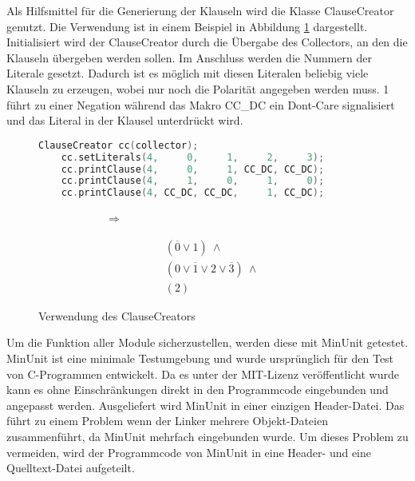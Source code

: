 Als Hilfsmittel für die Generierung der Klauseln wird die Klasse ClauseCreator genutzt. Die Verwendung ist in einem Beispiel in Abbildung \ref{fig:clausecreator} dargestellt.
Initialisiert wird der ClauseCreator durch die Übergabe des Collectors, an den die Klauseln übergeben werden sollen. Im Anschluss werden die Nummern der Literale gesetzt.
Dadurch ist es möglich mit diesen Literalen beliebig viele Klauseln zu erzeugen, wobei nur noch die Polarität angegeben werden muss. 1 führt zu einer Negation während
das Makro CC\_DC ein Dont-Care signalisiert und das Literal in der Klausel unterdrückt wird.
\begin{figure}[!h]
  \centering
  \begin{minipage}[c]{7.5cm}
    \begin{lstlisting}[language=c]
	ClauseCreator cc(collector);
	cc.setLiterals(4,     0,     1,     2,     3);
	cc.printClause(4,     0,     1, CC_DC, CC_DC);
	cc.printClause(4,     1,     0,     1,     0);
	cc.printClause(4, CC_DC, CC_DC,     1, CC_DC);
    \end{lstlisting}
  \end{minipage}
  \begin{minipage}[c]{2cm}
    ~~~~~~~~~~~~$ \Rightarrow $   
  \end{minipage}
  \begin{minipage}[c]{2cm}
    \begin{align*}
      & (\overline{0} \vee 1) ~ \wedge \\
      & (0 \vee \overline{1} \vee 2 \vee \overline{3}) ~ \wedge \\
      & (2) \nonumber
    \end{align*}
  \end{minipage}
  \caption{Verwendung des ClauseCreators}
  \label{fig:clausecreator}
\end{figure}

Um die Funktion aller Module sicherzustellen, werden diese mit MinUnit \cite{minunit} getestet. MinUnit ist eine minimale Testumgebung und
wurde ursprünglich für den Test von C-Programmen entwickelt. Da es unter der MIT-Lizenz veröffentlicht wurde kann es ohne Einschränkungen
direkt in den Programmcode eingebunden und angepasst werden. Ausgeliefert wird MinUnit in einer einzigen Header-Datei. Das führt zu einem
Problem wenn der Linker mehrere Objekt-Dateien zusammenführt, da MinUnit mehrfach eingebunden wurde. Um dieses Problem zu vermeiden, wird
der Programmcode von MinUnit in eine Header- und eine Quelltext-Datei aufgeteilt.

